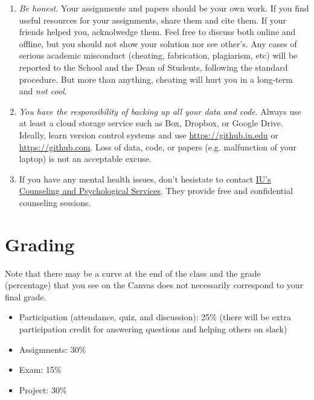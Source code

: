 \documentclass[11pt,article,oneside]{memoir} %
\begin{document}
\begin{enumerate}
\item \emph{Be honest.} Your assignments and papers should be your own work.
If you find useful resources for your assignments, share them and cite them. If
your friends helped you, acknolwedge them. Feel free to discuss both online and
offline, but you should not show your solution nor see other's. Any cases of
serious academic misconduct (cheating, fabrication, plagiarism, etc) will be
reported to the School and the Dean of Students, following the standard
procedure. But more than anything, cheating will hurt you in a long-term and
\emph{not cool}.

\item \emph{You have the responsibility of backing up all your data and code}.
Always use at least a cloud storage service such as Box, Dropbox, or Google
Drive. Ideally, learn version control systems and use
\url{https://github.iu.edu} or \url{https://github.com}. Loss of data, code, or
papers (e.g. malfunction of your laptop) is not an acceptable excuse.

\item If you have any mental health issues, don't hesistate to contact
\href{http://jhealthcenter.indiana.edu/counseling/index.shtml}{IU's Counseling
and Psychological Services}. They provide free and confidential counseling
sessions.


\end{enumerate}
\section{Grading} %
\label{sec:grading_tentative_}

Note that there may be a curve at the end of the class and the grade (percentage) that you see on the Canvas does not necessarily correspond to your final grade.

\begin{itemize}

\item Participation (attendance, quiz, and discussion): 25\% (there will be extra participation credit for answering questions and helping others on slack)

\item Assignments: 30\%

\item Exam: 15\%

\item Project: 30\%

\end{itemize}
\end{document}

